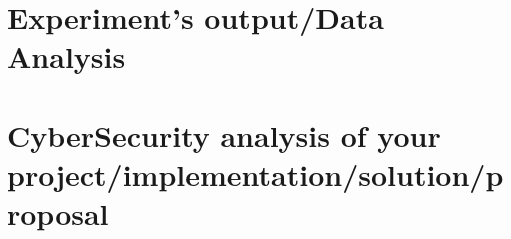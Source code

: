 \chapter{Experiment's output/Data Analysis}%
\pagestyle{fancy}
\lipsum[1-5] 

\chapter{CyberSecurity analysis of your project/implementation/solution/proposal}
